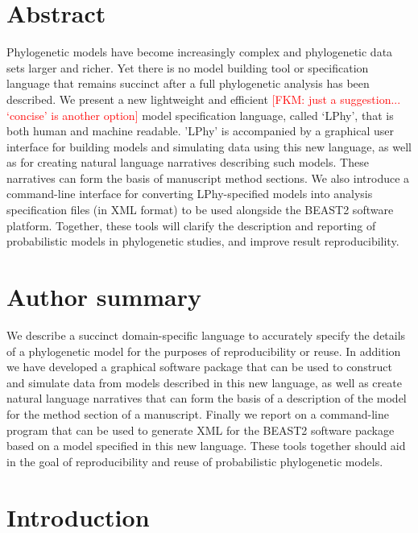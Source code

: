 \documentclass[10pt,letterpaper,table]{article}
\begin{document}
\section*{Abstract}
  Phylogenetic models have become increasingly complex and phylogenetic data sets larger and richer.
  Yet there is no model building tool or specification language that remains succinct after a full phylogenetic analysis has been described.
  We present a new lightweight and efficient \textcolor{red}{[FKM: just a suggestion... `concise' is another option]} model specification language, called `LPhy', that is both human and machine readable.
  'LPhy' is accompanied by a graphical user interface for building models and simulating data using this new language, as well as for creating natural language narratives describing such models.
  These narratives can form the basis of manuscript method sections.
  We also introduce a command-line interface for converting LPhy-specified models into analysis specification files (in XML format) to be used alongside the BEAST2 software platform.
  Together, these tools will clarify the description and reporting of probabilistic models in phylogenetic studies, and improve result reproducibility.


\section*{Author summary}
  We describe a succinct domain-specific language to accurately specify the details of a phylogenetic model for the purposes of reproducibility or reuse.
  In addition we have developed a graphical software package that can be used to construct and simulate data from models described in this new language, as well as create natural language narratives that can form the basis of a description of the model for the method section of a manuscript.
  Finally we report on a command-line program that can be used to generate XML for the BEAST2 software package based on a model specified in this new language.
  These tools together should aid in the goal of reproducibility and reuse of probabilistic phylogenetic models. 


\linenumbers

\section{Introduction}
\end{document}
